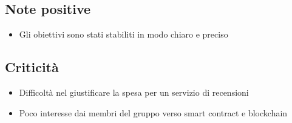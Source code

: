 \subsection*{Note positive}
\begin{itemize}
    \item Gli obiettivi sono stati stabiliti in modo chiaro e preciso
\end{itemize}
\subsection*{Criticità}
\begin{itemize}
    \item Difficoltà nel giustificare la spesa per un servizio di recensioni
    \item Poco interesse dai membri del gruppo verso smart contract e blockchain
\end{itemize}
